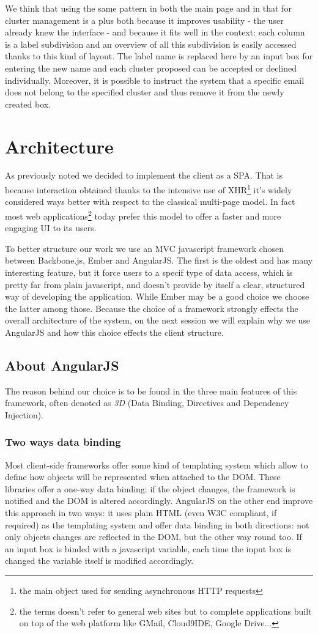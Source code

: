 \documentclass[a4paper,12pt]{report}
\begin{document}
We think that using the same pattern in both the main page and in that for cluster management is a plus both because it improves usability - the user already knew the interface - and because it fits well in the context: each column is a label subdivision and an overview of all this subdivision is easily accessed thanks to this kind of layout. The label name is replaced here by an input box for entering the new name and each cluster proposed can be accepted or declined individually.
Moreover, it is possible to instruct the system that a specific email does not belong to the specified cluster and thus remove it from the newly created box.

\section{Architecture}
As previously noted we decided to implement the client as a SPA. That is because interaction obtained thanks to the intensive use of XHR\footnote{the main object used for sending asynchronous HTTP requests} it's widely considered ways better with respect to the classical multi-page model. In fact most web applications\footnote{the terms doesn't refer to general web sites but to complete applications built on top of the web platform like GMail, Cloud9IDE, Google Drive...} today prefer this model to offer a faster and more engaging UI to its users. 

To better structure our work we use an MVC javascript framework chosen between Backbone.js, Ember and AngularJS. The first is the oldest and has many interesting feature, but it force users to a specif type of data access, which is pretty far from plain javascript, and doesn't provide by itself a clear, structured way of developing the application. While Ember may be a good choice we choose the latter among those.
Because the choice of a framework strongly effects the overall architecture of the system, on the next session we will explain why we use AngularJS and how this choice effects the client structure.
\subsection{About AngularJS}
The reason behind our choice is to be found in the three main features of this framework, often denoted as \emph{3D} (Data Binding, Directives and Dependency Injection).
\subsubsection{Two ways data binding}
Most client-side frameworks offer some kind of templating system which allow to define how objects will be represented when attached to the DOM. These libraries offer a one-way data binding: if the object changes, the framework is notified and the DOM is altered accordingly.
AngularJS on the other end improve this approach in two ways: it uses plain HTML (even W3C compliant, if required) as the templating system and offer data binding in both directions: not only objects changes are reflected in the DOM, but the other way round too. If an input box is binded with a javascript variable, each time the input box is changed the variable itself is modified accordingly.
\end{document}
